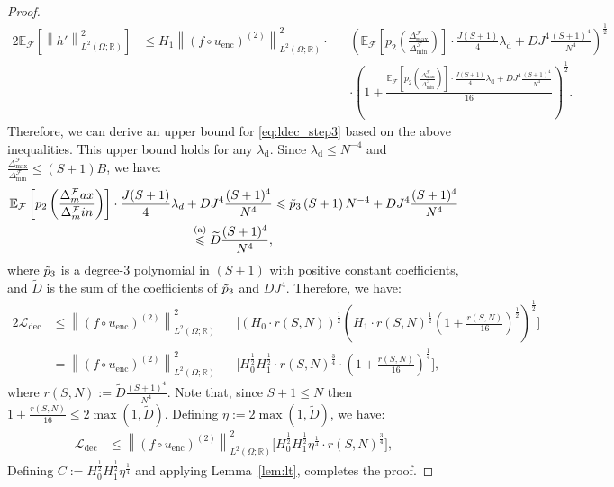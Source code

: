 \documentclass{article}
\def\encs{u_\textrm{enc}}
\def\declamb{\lambda_\textrm{d}}
\def\ldec{\mathcal{L}_\textrm{dec}}
\def\stset{\mathcal{F}}
\newcommand{\norm}[1]{\left\lVert#1\right\rVert}
\newcommand{\lp}[1]{{L}^{#1}\left(\Omega; \mathbb{R}\right)}
\newcommand{\lec}[2]{\stackrel{\text{#1}}{#2}}
\begin{document}
\begin{proof}
\begin{alignat}{2}
    \mathbb{E}_{\stset}\left[\norm{h'}^2_{\lp{2}}\right] &\leqslant H_1\norm{(f\circ\encs)^{(2)}}^2_{\lp{2}}\cdot &&\left(\mathbb{E}_{\stset}\left[p_2\left(\frac{\Delta^\stset_\textrm{max}}{\Delta^\stset_\textrm{min}}\right)\right]\cdot\frac{J(S+1)}{4} \declamb + DJ^4\frac{(S+1)^4}{N^4}\right)^{\frac{1}{2}} \nonumber \\ & &&\cdot\left(1 + \frac{\mathbb{E}_{\stset}\left[p_2\left(\frac{\Delta^\stset_\textrm{max}}{\Delta^\stset_\textrm{min}}\right)\right]\cdot\frac{J(S+1)}{4} \declamb + DJ^4\frac{(S+1)^4}{N^4}}{16}\right)^{\frac{1}{2}}.
\end{alignat}
Therefore, we can derive an upper bound for \eqref{eq:ldec_step3} based on the above inequalities. This upper bound holds for any $\declamb$. Since $\declamb \leqslant N^{-4}$ and $\frac{\Delta^\stset_\textrm{max}}{\Delta^\stset_\textrm{min}} \leqslant (S+1)B$, we have:
\begin{align}
\mathbb{E}_{\stset}\left[p_2\left(\frac{\Delta^\stset_\textrm{max}}{\Delta^\stset_\textrm{min}}\right)\right]\cdot\frac{J(S+1)}{4} \declamb + DJ^4\frac{(S+1)^4}{N^4} &\leqslant \Tilde{p}_3\left(S+1\right)N^{-4} + DJ^4\frac{(S+1)^4}{N^4} \nonumber \\
\lec{(a)}{\leqslant} \widetilde{D}\frac{(S+1)^4}{N^4},
\end{align}
where $\Tilde{p}_3$ is a degree-3 polynomial in $(S+1)$ with positive constant coefficients, and $\widetilde{D}$ is the sum of the coefficients of $\Tilde{p}_3$ and $DJ^4$. Therefore, we have:
\begin{alignat}{2} \label{eq:ldec_noiseless_bound_1}
    \ldec &\leqslant \norm{(f\circ\encs)^{(2)}}^2_{\lp{2}} &&\Biggl[\left(H_0\cdot r(S, N)\right)^\frac{1}{2}\left(H_1\cdot r(S, N)^\frac{1}{2}\left(1 + \frac{r(S, N)}{16}\right)^\frac{1}{2}\right)^\frac{1}{2}
    \Biggr]
    \nonumber \\
    &\lec{}{=} \norm{(f\circ\encs)^{(2)}}^2_{\lp{2}} &&\Biggl[H_0^\frac{1}{2}H_1^\frac{1}{2}\cdot r(S, N)^\frac{3}{4}\cdot \left(1 + \frac{r(S, N)}{16}\right)^\frac{1}{4}
    \Biggr],
\end{alignat}
where $r(S, N):=\widetilde{D}\frac{(S+1)^4}{N^4}$. Note that, since $S+1 \leqslant N$ then $1 + \frac{r(S, N)}{16} \leqslant 2\max(1, \widetilde{D})$. Defining $\eta:=2\max(1, \widetilde{D})$, we have:
\begin{align}
    \ldec &\lec{}{\leqslant} \norm{(f\circ\encs)^{(2)}}^2_{\lp{2}} \Biggl[H_0^\frac{1}{2}H_1^\frac{1}{2} \eta^\frac{1}{4} \cdot r(S, N)^\frac{3}{4}\Biggr],
\end{align}
Defining $C := H_0^\frac{1}{2}H_1^\frac{1}{2} \eta^\frac{1}{4}$ and applying Lemma~\ref{lem:lt}, completes the proof.
\end{proof}
\end{document}
